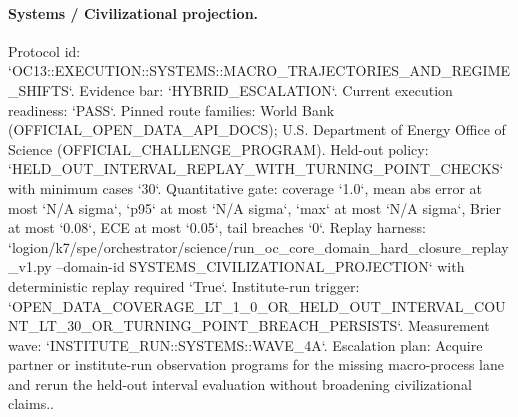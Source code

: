 \paragraph{Systems / Civilizational projection.}
Protocol id: `OC13::EXECUTION::SYSTEMS::MACRO\_TRAJECTORIES\_AND\_REGIME\_SHIFTS`. Evidence bar: `HYBRID\_ESCALATION`. Current execution readiness: `PASS`.
Pinned route families: World Bank (OFFICIAL\_OPEN\_DATA\_API\_DOCS); U.S. Department of Energy Office of Science (OFFICIAL\_CHALLENGE\_PROGRAM).
Held-out policy: `HELD\_OUT\_INTERVAL\_REPLAY\_WITH\_TURNING\_POINT\_CHECKS` with minimum cases `30`.
Quantitative gate: coverage `1.0`, mean abs error at most `N/A sigma`, `p95` at most `N/A sigma`, `max` at most `N/A sigma`, Brier at most `0.08`, ECE at most `0.05`, tail breaches `0`.
Replay harness: `logion/k7/spe/orchestrator/science/run\_oc\_core\_domain\_hard\_closure\_replay\_v1.py --domain-id SYSTEMS\_CIVILIZATIONAL\_PROJECTION` with deterministic replay required `True`.
Institute-run trigger: `OPEN\_DATA\_COVERAGE\_LT\_1\_0\_OR\_HELD\_OUT\_INTERVAL\_COUNT\_LT\_30\_OR\_TURNING\_POINT\_BREACH\_PERSISTS`. Measurement wave: `INSTITUTE\_RUN::SYSTEMS::WAVE\_4A`.
Escalation plan: Acquire partner or institute-run observation programs for the missing macro-process lane and rerun the held-out interval evaluation without broadening civilizational claims..
